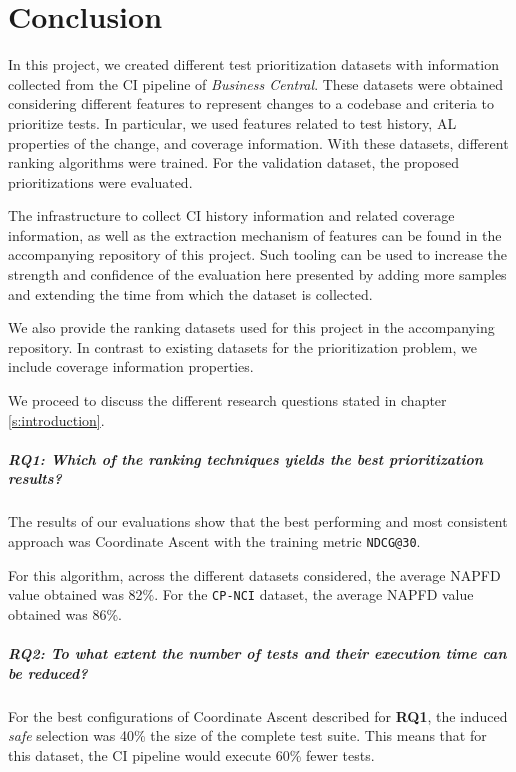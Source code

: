 \chapter{Conclusion}

In this project, we created different test prioritization datasets with 
information collected from the CI pipeline of \emph{Business Central}. These datasets were obtained
considering different features to represent changes to a codebase and criteria to prioritize tests.
In particular, we used features related to test history, AL properties of the change, and coverage information.
With these datasets, different ranking algorithms were trained. For the validation dataset,
the proposed prioritizations were evaluated.

The infrastructure to collect CI history information and related coverage information,
as well as the extraction mechanism of features can be found in the accompanying 
repository of this project. Such tooling can be used to increase the strength and confidence of the 
evaluation here presented by adding more samples and extending 
the time from which the dataset is collected. 

We also provide the ranking datasets used for this project in the 
accompanying repository. In contrast to existing datasets
for the prioritization problem, we include coverage information properties.

We proceed to discuss the different research questions stated in chapter \ref{s:introduction}.

\paragraph{RQ1: Which of the ranking techniques yields the best prioritization results?}
The results of our evaluations show that the
best performing and most consistent approach was Coordinate Ascent
with the training metric \texttt{NDCG@30}.

For this algorithm, across the different datasets considered, the average NAPFD value obtained was 82\%.
For the \texttt{CP-NCI} dataset, the average NAPFD value obtained was 86\%.

\paragraph{RQ2: To what extent the number of tests and their execution time can be reduced?}
For the best configurations of Coordinate Ascent described for \textbf{RQ1},
the induced \emph{safe} selection was 40\% the size of the complete test suite.
This means that for this dataset, the CI pipeline would execute 60\% fewer tests.

